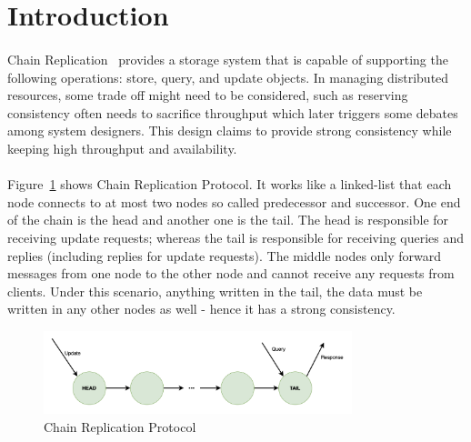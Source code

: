 \section{Introduction}
\setcounter{subsection}{0}
\renewcommand*{\thesubsection}{\Alph{subsection}.}

\paragraph*{}
Chain Replication~\cite{van2004chain} provides a storage system that is capable of supporting the following operations: store, query, and update objects. In managing distributed resources, some trade off might need to be considered, such as reserving consistency often needs to sacrifice throughput which later triggers some debates among system designers. This design claims to provide strong consistency while keeping high throughput and availability.

\paragraph*{}
Figure~\ref{fig:CRP} shows Chain Replication Protocol. It works like a linked-list that each node connects to at most two nodes so called predecessor and successor. One end of the chain is the head and another one is the tail. The head is responsible for receiving update requests; whereas the tail is responsible for receiving queries and replies (including replies for update requests). The middle nodes only forward messages from one node to the other node and cannot receive any requests from clients. Under this scenario, anything written in the tail, the data must be written in any other nodes as well - hence it has a strong consistency.

\begin{figure}[h]
    \centering
    \includegraphics[width=0.8\textwidth]{images/ChainReplication.png}
    \caption{Chain Replication Protocol}
    \label{fig:CRP}
\end{figure}

